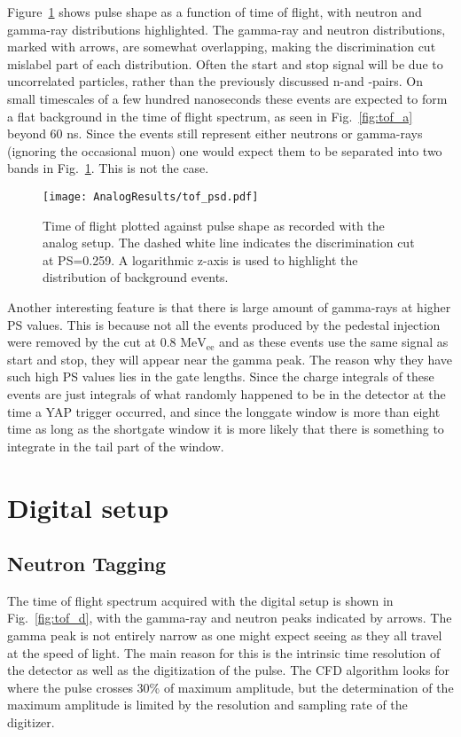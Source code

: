 \documentclass[main.tex]{subfiles}
\begin{document}
Figure~\ref{fig:tof_ps_a} shows pulse shape as a function of time of flight, with neutron and gamma-ray distributions highlighted. The gamma-ray and neutron distributions, marked with arrows, are somewhat overlapping, making the discrimination cut mislabel part of each distribution. Often the start and stop signal will be due to uncorrelated particles, rather than the previously discussed n-\textgamma and \textgamma-\textgamma pairs. On small timescales of a few hundred nanoseconds these events are expected to form a flat background in the time of flight spectrum, as seen in Fig.~\ref{fig:tof_a} beyond 60 ns. Since the events still represent either neutrons or gamma-rays (ignoring the occasional muon) one would expect them to be separated into two bands in Fig.~\ref{fig:tof_ps_a}. This is not the case.

\begin{figure}[ht]
    \centering
        \texttt{[image: AnalogResults/tof\_psd.pdf]}
        \caption[Heat map of pulse shape as a function of time of flight.]{Time of flight plotted against pulse shape as recorded with the analog setup. The dashed white line indicates the discrimination cut at PS=0.259. A logarithmic z-axis is used to highlight the distribution of background events.}
    \label{fig:tof_ps_a} 
\end{figure}




Another interesting feature is that there is large amount of gamma-rays at higher PS values. This is because not all the events produced by the pedestal injection were removed by the cut at 0.8 $\text{MeV}_\text{ee}$ and as these events use the same signal as start and stop, they will appear near the gamma peak. The reason why they have such high PS values lies in the gate lengths. Since the charge integrals of these events are just integrals of what randomly happened to be in the detector at the time a YAP trigger occurred, and since the longgate window is more than eight time as long as the shortgate window it is more likely that there is something to integrate in the tail part of the window.



\section{Digital setup}

\subsection{Neutron Tagging}
The time of flight spectrum acquired with the digital setup is shown in Fig.~\ref{fig:tof_d}, with the gamma-ray and neutron peaks indicated by arrows. The gamma peak is not entirely narrow as one might expect seeing as they all travel at the speed of light. The main reason for this is the intrinsic time resolution of the detector as well as the digitization of the pulse. The CFD algorithm looks for where the pulse crosses 30\% of maximum amplitude, but the determination of the maximum amplitude is limited by the resolution and sampling rate of the digitizer.
\end{document}
